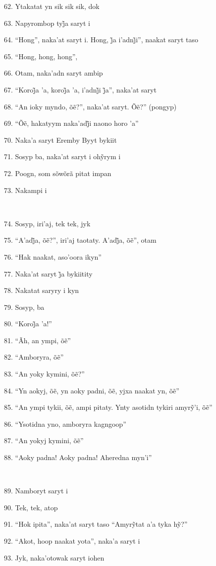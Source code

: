 62. Ytakatat yn sik sik sik, dok

63. Napyrombop tyj̃a saryt i

64. ``Hong'', naka’at saryt i. Hong, j̃a i’adnj̃i'', naakat saryt taso

65. ``Hong, hong, hong'',

66. Otam, naka'adn saryt ambip

67. ``Koroj̃a ’a, koroj̃a ’a, i’adnj̃i j̃a'', naka’at saryt

68. ``An ioky myndo, õẽ?'', naka’at saryt. Õẽ?'' (pongyp)

69. ``Õẽ, hakatyym naka’adj̃i naono horo ’a''

70. Naka'a saryt Eremby Byyt bykiit

71. Sosyp ba, naka’at saryt i ohỹrym i

72. Poogn, som sõwõrã pitat impan

73. Nakampi i

~

74. Sosyp, iri'aj, tek tek, jyk

75. ``A’adj̃a, õẽ?'', iri’aj taotaty. A’adj̃a, õẽ'', otam

76. ``Hak naakat, aso'oora ikyn''

77. Naka’at saryt j̃a bykiitity

78. Nakatat saryry i kyn

79. Sosyp, ba

80. ``Koroj̃a ’a!''

81. ``Ãh, an ympi, õẽ''

82. ``Amboryra, õẽ''

83. ``An yoky kymini, õẽ?''

84. ``Yn aokyj, õẽ, yn aoky padni, õẽ, yjxa naakat yn, õẽ''

85. ``An ympi tykii, õẽ, ampi pitaty. Ynty asotidn tykiri amyrỹ’i, õẽ''

86. ``Ysotidna yno, amboryra kagngoop''

87. ``An yokyj kymini, õẽ''

88. ``Aoky padna! Aoky padna! Aheredna myn'i''

~

89. Namboryt saryt i

90. Tek, tek, atop

91. ``Hok ipita'', naka’at saryt taso ``Amyrỹtat a’a tyka hỹ?''

92. ``Akot, hoop naakat yota'', naka'a saryt i

93. Jyk, naka'otowak saryt iohen

